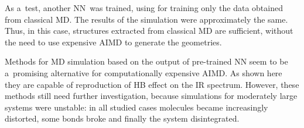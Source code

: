 As a~test, another NN~was trained, using for training only the data obtained from classical MD. The results of the simulation were approximately the same. Thus, in this case, structures extracted from classical MD are sufficient, without the need to use expensive AIMD to generate the geometries.

Methods for MD simulation based on the output of pre-trained NN seem to be a~promising alternative for computationally expensive AIMD. As shown here they are capable of reproduction of HB effect on the IR spectrum. However, these methods still need further investigation, because simulations for moderately large systems were unstable: in all studied cases molecules became increasingly distorted, some bonds broke and finally the system disintegrated.